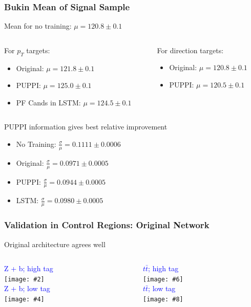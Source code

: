 \documentclass{beamer}
\newcommand{\fourfigs}[8]{
  \begin{columns}
    \begin{column}{0.3\linewidth}
      \centering
      \textcolor{blue}{#1} \\
      \texttt{[image: \#2]} \\
      \textcolor{blue}{#3} \\
      \texttt{[image: \#4]}
    \end{column}
    \begin{column}{0.3\linewidth}
      \centering
      \textcolor{blue}{#5} \\
      \texttt{[image: \#6]} \\
      \textcolor{blue}{#7} \\
      \texttt{[image: \#8]}
    \end{column}
  \end{columns}
}
\begin{document}
\begin{frame}
  \frametitle{Bukin Mean of Signal Sample}

  Mean for no training: $\mu = 120.8 \pm 0.1$

  \vspace{12pt}

  \begin{columns}
    \begin{column}{0.5\linewidth}
      For $p_T$ targets:
      \begin{itemize}
      \item Original: $\mu = 121.8 \pm 0.1$
      \item PUPPI: $\mu = 125.0 \pm 0.1$
      \item PF Cands in LSTM: $\mu = 124.5 \pm 0.1$
      \end{itemize}
    \end{column}
    \begin{column}{0.5\linewidth}
      For direction targets:
      \begin{itemize}
      \item Original: $\mu = 120.8 \pm 0.1$
      \item PUPPI: $\mu = 120.5 \pm 0.1$
        \phantom{\item PF Cands in LSTM: \\ $\mu = 12.22$}
        \phantom{\item PF Cands in LSTM: \\ $\mu = 12.22$}
      \end{itemize}
    \end{column}
  \end{columns}

  \vspace{24pt}

  PUPPI information gives best relative improvement

  \begin{itemize}
  \item No Training: $\frac\sigma\mu = 0.1111 \pm 0.0006$
  \item Original: $\frac\sigma\mu = 0.0971 \pm 0.0005$
  \item PUPPI: $\frac\sigma\mu = 0.0944 \pm 0.0005$
  \item LSTM: $\frac\sigma\mu = 0.0980 \pm 0.0005$
  \end{itemize}

\end{frame}


\begin{frame}
  \frametitle{Validation in Control Regions: Original Network}

  Original architecture agrees well

  \fourfigs{Z + b; high tag}
           {190813_validation/heavyz_jet1_tf_190723_origin_ptratio.pdf}
           {Z + b; low tag}
           {190813_validation/heavyz_jet2_tf_190723_origin_ptratio.pdf}
           {$t\bar{t}$; high tag}
           {190813_validation/tt_jet1_tf_190723_origin_ptratio.pdf}
           {$t\bar{t}$; low tag}
           {190813_validation/tt_jet2_tf_190723_origin_ptratio.pdf}

\end{frame}
\end{document}
